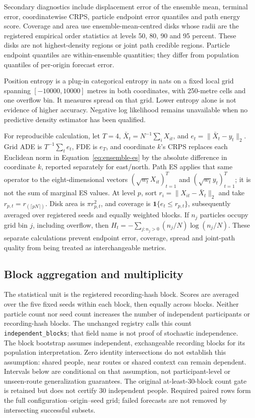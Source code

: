 \documentclass[11pt]{article}
\begin{document}
Secondary diagnostics include displacement error of the ensemble mean,
terminal error, coordinatewise CRPS, particle endpoint error quantiles and
path energy score. Coverage and area use ensemble-mean-centred disks whose
radii are the registered empirical order statistics at levels 50, 80, 90
and 95 percent. These disks are not highest-density regions or joint path
credible regions. Particle endpoint quantiles are within-ensemble quantities;
they differ from population quantiles of per-origin forecast error.

Position entropy is a plug-in categorical entropy in nats on a fixed local
grid spanning \([-10000,10000]\) metres in both coordinates, with 250-metre
cells and one overflow bin. It measures spread on that grid. Lower entropy
alone is not evidence of higher accuracy. Negative log likelihood remains
unavailable when no predictive density estimator has been qualified.

For reproducible calculation, let \(T=4\),
\(\bar X_t=N^{-1}\sum_iX_{it}\), and \(e_t=\|\bar X_t-y_t\|_2\).
Grid ADE is \(T^{-1}\sum_t e_t\), FDE is \(e_T\), and coordinate \(k\)'s
CRPS replaces each Euclidean norm in Equation~\eqref{eq:ensemble-es} by the
absolute difference in coordinate \(k\), reported separately for east/north.
Path ES applies that same operator to the eight-dimensional vectors
\((\sqrt{w_t}X_{it})_{t=1}^T\) and \((\sqrt{w_t}y_t)_{t=1}^T\);
it is not the sum of marginal ES values.
At level \(p\), sort \(r_i=\|X_{it}-\bar X_t\|_2\) and take
\(r_{p,t}=r_{(\lceil pN\rceil)}\). Disk area is \(\pi r_{p,t}^2\), and
coverage is \(\mathbf1\{e_t\leq r_{p,t}\}\), subsequently averaged over
registered seeds and equally weighted blocks. If \(n_j\) particles occupy
grid bin \(j\), including overflow, then
\(H_t=-\sum_{j:n_j>0}(n_j/N)\log(n_j/N)\).
These separate calculations prevent endpoint error, coverage, spread and
joint-path quality from being treated as interchangeable metrics.

\subsection{Block aggregation and multiplicity}
The statistical unit is the registered recording-hash block. Scores are averaged
over the five fixed seeds within each block, then equally across blocks.
Neither particle count nor seed count increases the number of independent
participants or recording-hash blocks. The unchanged registry calls this
count \texttt{independent\_blocks}; that field name is not proof of stochastic
independence. The block bootstrap assumes independent, exchangeable
recording blocks for its population interpretation. Zero identity intersections
do not establish this assumption: shared people, near routes or shared context
can remain dependent. Intervals below are conditional on that assumption,
not participant-level or unseen-route generalization guarantees. The original
at-least-30-block count gate is retained but does not certify 30 independent
people. Required paired rows form the full configuration--origin--seed grid;
failed forecasts are not removed by intersecting successful subsets.
\end{document}

